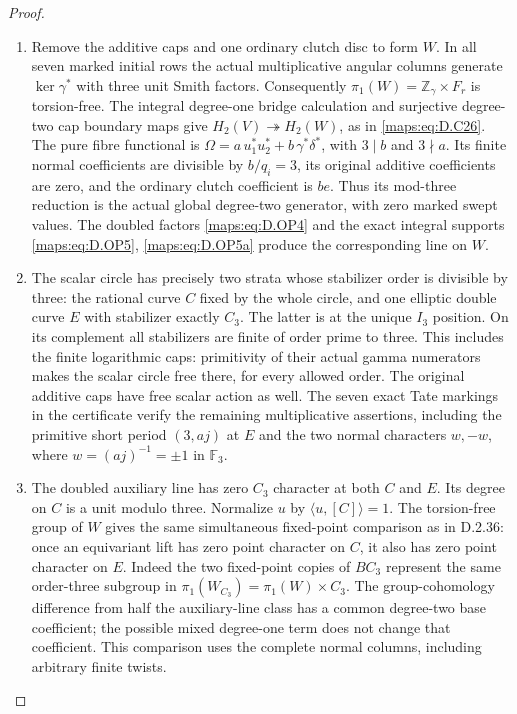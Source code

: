 \begin{proof}
\begin{enumerate}[label=\arabic*.,leftmargin=*]
\item Remove the additive caps and one ordinary clutch disc to form $W$.
In all seven marked initial rows the actual multiplicative angular
columns generate $\ker\gamma^*$ with three unit Smith factors.
Consequently $\pi_1(W)=\mathbb Z_\gamma\times F_r$ is torsion-free.
The integral degree-one bridge calculation and surjective degree-two
cap boundary maps give $H_2(V)\twoheadrightarrow H_2(W)$, as in
\eqref{maps:eq:D.C26}. The pure fibre functional is
$\Omega=a\,u_1^*u_2^*+b\,\gamma^*\delta^*$, with $3\mid b$
and $3\nmid a$. Its finite normal coefficients are divisible by
$b/q_i=3$, its original additive coefficients are zero, and the
ordinary clutch coefficient is $be$. Thus its mod-three reduction
is the actual global degree-two generator, with zero marked swept
values. The doubled factors \eqref{maps:eq:D.OP4} and the exact integral supports
\eqref{maps:eq:D.OP5}, \eqref{maps:eq:D.OP5a} produce the corresponding line on $W$.

\item The scalar circle has precisely two strata whose stabilizer order is
divisible by three: the rational curve $C$ fixed by the whole circle,
and one elliptic double curve $E$ with stabilizer exactly $C_3$.
The latter is at the unique $I_3$ position. On its complement all
stabilizers are finite of order prime to three. This includes the
finite logarithmic caps: primitivity of their actual gamma numerators
makes the scalar circle free there, for every allowed order.
The original additive caps have free scalar action as well.
The seven exact Tate markings in the certificate verify the remaining
multiplicative assertions, including the primitive short period
$(3,aj)$ at $E$ and the two normal characters
$w,-w$, where $w=(aj)^{-1}=\pm1$ in $\mathbb F_3$.

\item The doubled auxiliary line has zero $C_3$ character at both $C$ and
$E$. Its degree on $C$ is a unit modulo three. Normalize $u$ by
$\langle u,[C]\rangle=1$. The torsion-free group of $W$ gives the
same simultaneous fixed-point comparison as in D.2.36: once an
equivariant lift has zero point character on $C$, it also has zero
point character on $E$. Indeed the two fixed-point copies of $BC_3$
represent the same order-three subgroup in
$\pi_1(W_{C_3})=\pi_1(W)\times C_3$. The group-cohomology difference
from half the auxiliary-line class has a common degree-two base
coefficient; the possible mixed degree-one term does not change
that coefficient. This comparison uses the complete normal columns,
including arbitrary finite twists.


\end{enumerate}
\end{proof}

